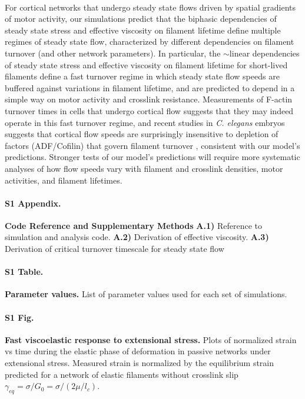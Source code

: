 \paragraph{} For cortical networks that undergo steady state flows driven by spatial gradients of motor activity, our simulations predict that the biphasic dependencies of steady state stress and effective viscosity on filament lifetime define multiple regimes of steady state flow, characterized by different dependencies on filament turnover (and other network parameters).  In particular, the $\sim$linear dependencies of steady state stress and effective viscosity on filament lifetime for short-lived filaments define a fast turnover regime in which steady state flow speeds are buffered against variations in filament lifetime, and are predicted to depend in a simple way on motor activity and crosslink resistance.  Measurements of F-actin turnover times in cells that undergo cortical flow \cite{Theriot1991,Murthy2016,Watanabe1083,Guha2016,Fritzsche15032013,Robin:2014aa} suggests that they may indeed operate in this fast turnover regime, and recent studies in {\em C. elegans} embryos suggests that cortical flow speeds are surprisingly insensitive to depletion of factors (ADF/Cofilin) that govern filament turnover \cite{cellmech_flows}, consistent with our model's predictions. Stronger tests of our model's predictions will require more systematic analyses of how flow speeds vary with filament and crosslink densities, motor activities, and filament lifetimes.



\paragraph*{S1 Appendix.}
\label{S1_Text}
{\bf Code Reference and Supplementary Methods}  \textbf{A.1)} Reference to simulation and analysis code. \textbf{A.2)} Derivation of effective viscosity. \textbf{A.3)} Derivation of critical turnover timescale for steady state flow

\paragraph*{S1 Table.}
\label{S1_Table}
{\bf Parameter values.}  List of parameter values used for each set of simulations.



\paragraph*{S1 Fig.}
\label{fig:passive_supp}
{\bf  Fast viscoelastic response to extensional stress.}  Plots of normalized strain vs time during the elastic phase of deformation in passive networks under extensional stress.  Measured strain is normalized by the equilibrium strain predicted for a network of elastic filaments without crosslink slip $\gamma_{eq} = \sigma/G_0 = \sigma/(2\mu/l_c)$.  


